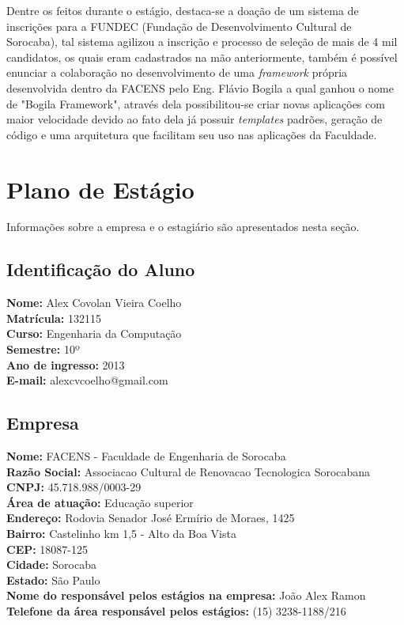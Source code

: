 \documentclass[
	12pt,				%
	oneside,			%
	a4paper,			%
	chapter=TITLE,		%
	section=TITLE,		%
	sumario=tradicional %
	english,			%
	french,				%
	spanish,			%
	brazil				%
	]{abntex2}
\begin{document}
Dentre os feitos durante o estágio, destaca-se a doação de um sistema de inscrições para a FUNDEC (Fundação de Desenvolvimento Cultural de Sorocaba), tal sistema agilizou a inscrição e processo de seleção de mais de 4 mil candidatos, os quais eram cadastrados na mão anteriormente, também é possível enunciar a colaboração no desenvolvimento de uma \textit{framework} própria desenvolvida dentro da FACENS pelo Eng. Flávio Bogila a qual ganhou o nome de "Bogila Framework", através dela possibilitou-se criar novas aplicações com maior velocidade devido ao fato dela já possuir \textit{templates} padrões, geração de código e uma arquitetura que facilitam seu uso nas aplicações da Faculdade.

\chapter{Plano de Estágio}
\label{chap:cap2}
Informações sobre a empresa e o estagiário são apresentados nesta seção.
\section{Identificação do Aluno}
\label{sec:identaluno}
\textbf{Nome:} Alex Covolan Vieira Coelho\\
\indent \textbf{Matrícula: } 132115\\
\indent \textbf{Curso: } Engenharia da Computação\\
\indent \textbf{Semestre: } 10º\\
\indent \textbf{Ano de ingresso: } 2013\\
\indent \textbf{E-mail: } alexcvcoelho@gmail.com\\

\section{Empresa}
\label{sec:empresa}
\textbf{Nome:} FACENS - Faculdade de Engenharia de Sorocaba \\
\indent \textbf{Razão Social:} Associacao Cultural de Renovacao Tecnologica Sorocabana \\
\indent \textbf{CNPJ:} 45.718.988/0003-29 \\
\indent \textbf{Área de atuação:} Educação superior\\
\indent \textbf{Endereço:} Rodovia Senador José Ermírio de Moraes, 1425 \\
\indent \textbf{Bairro:} Castelinho km 1,5 - Alto da Boa Vista \\
\indent \textbf{CEP:} 18087-125 \\
\indent \textbf{Cidade:} Sorocaba \\
\indent \textbf{Estado:} São Paulo \\
\indent \textbf{Nome do responsável pelos estágios na empresa:} João Alex Ramon \\
\indent \textbf{Telefone da área responsável pelos estágios:} (15) 3238-1188/216 \\
\end{document}
